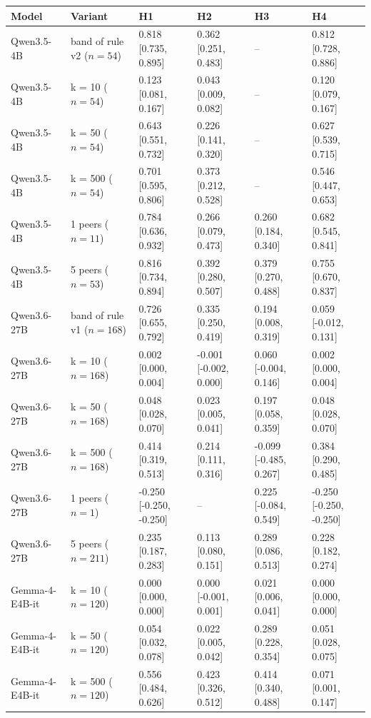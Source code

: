 \begin{tabular}{llllll}
\toprule
Model & Variant & H1 & H2 & H3 & H4 \\
\midrule
Qwen3.5-4B & band of rule v2 ($n{=}54$) & 0.818 [0.735, 0.895] & 0.362 [0.251, 0.483] & -- & 0.812 [0.728, 0.886] \\
Qwen3.5-4B & k = 10 ($n{=}54$) & 0.123 [0.081, 0.167] & 0.043 [0.009, 0.082] & -- & 0.120 [0.079, 0.167] \\
Qwen3.5-4B & k = 50 ($n{=}54$) & 0.643 [0.551, 0.732] & 0.226 [0.141, 0.320] & -- & 0.627 [0.539, 0.715] \\
Qwen3.5-4B & k = 500 ($n{=}54$) & 0.701 [0.595, 0.806] & 0.373 [0.212, 0.528] & -- & 0.546 [0.447, 0.653] \\
Qwen3.5-4B & 1 peers ($n{=}11$) & 0.784 [0.636, 0.932] & 0.266 [0.079, 0.473] & 0.260 [0.184, 0.340] & 0.682 [0.545, 0.841] \\
Qwen3.5-4B & 5 peers ($n{=}53$) & 0.816 [0.734, 0.894] & 0.392 [0.280, 0.507] & 0.379 [0.270, 0.488] & 0.755 [0.670, 0.837] \\
\midrule
Qwen3.6-27B & band of rule v1 ($n{=}168$) & 0.726 [0.655, 0.792] & 0.335 [0.250, 0.419] & 0.194 [0.008, 0.319] & 0.059 [-0.012, 0.131] \\
Qwen3.6-27B & k = 10 ($n{=}168$) & 0.002 [0.000, 0.004] & -0.001 [-0.002, 0.000] & 0.060 [-0.004, 0.146] & 0.002 [0.000, 0.004] \\
Qwen3.6-27B & k = 50 ($n{=}168$) & 0.048 [0.028, 0.070] & 0.023 [0.005, 0.041] & 0.197 [0.058, 0.359] & 0.048 [0.028, 0.070] \\
Qwen3.6-27B & k = 500 ($n{=}168$) & 0.414 [0.319, 0.513] & 0.214 [0.111, 0.316] & -0.099 [-0.485, 0.267] & 0.384 [0.290, 0.485] \\
Qwen3.6-27B & 1 peers ($n{=}1$) & -0.250 [-0.250, -0.250] & -- & 0.225 [-0.084, 0.549] & -0.250 [-0.250, -0.250] \\
Qwen3.6-27B & 5 peers ($n{=}211$) & 0.235 [0.187, 0.283] & 0.113 [0.080, 0.151] & 0.289 [0.086, 0.513] & 0.228 [0.182, 0.274] \\
\midrule
Gemma-4-E4B-it & k = 10 ($n{=}120$) & 0.000 [0.000, 0.000] & 0.000 [-0.001, 0.001] & 0.021 [0.006, 0.041] & 0.000 [0.000, 0.000] \\
Gemma-4-E4B-it & k = 50 ($n{=}120$) & 0.054 [0.032, 0.078] & 0.022 [0.005, 0.042] & 0.289 [0.228, 0.354] & 0.051 [0.028, 0.075] \\
Gemma-4-E4B-it & k = 500 ($n{=}120$) & 0.556 [0.484, 0.626] & 0.423 [0.326, 0.512] & 0.414 [0.340, 0.488] & 0.071 [0.001, 0.147] \\

\end{tabular}

